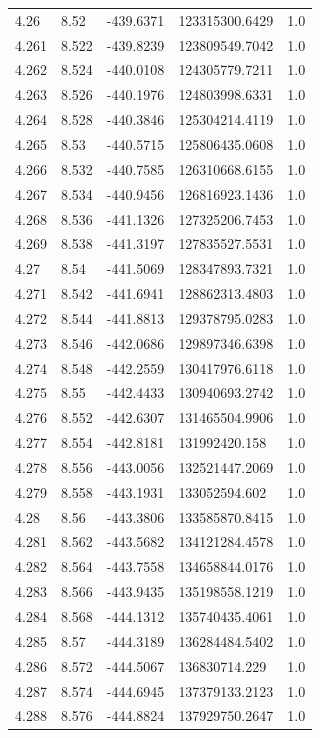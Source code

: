 \begin{tabular}{lllll}
4.26 & 8.52 & -439.6371 & 123315300.6429 & 1.0 \\
4.261 & 8.522 & -439.8239 & 123809549.7042 & 1.0 \\
4.262 & 8.524 & -440.0108 & 124305779.7211 & 1.0 \\
4.263 & 8.526 & -440.1976 & 124803998.6331 & 1.0 \\
4.264 & 8.528 & -440.3846 & 125304214.4119 & 1.0 \\
4.265 & 8.53 & -440.5715 & 125806435.0608 & 1.0 \\
4.266 & 8.532 & -440.7585 & 126310668.6155 & 1.0 \\
4.267 & 8.534 & -440.9456 & 126816923.1436 & 1.0 \\
4.268 & 8.536 & -441.1326 & 127325206.7453 & 1.0 \\
4.269 & 8.538 & -441.3197 & 127835527.5531 & 1.0 \\
4.27 & 8.54 & -441.5069 & 128347893.7321 & 1.0 \\
4.271 & 8.542 & -441.6941 & 128862313.4803 & 1.0 \\
4.272 & 8.544 & -441.8813 & 129378795.0283 & 1.0 \\
4.273 & 8.546 & -442.0686 & 129897346.6398 & 1.0 \\
4.274 & 8.548 & -442.2559 & 130417976.6118 & 1.0 \\
4.275 & 8.55 & -442.4433 & 130940693.2742 & 1.0 \\
4.276 & 8.552 & -442.6307 & 131465504.9906 & 1.0 \\
4.277 & 8.554 & -442.8181 & 131992420.158 & 1.0 \\
4.278 & 8.556 & -443.0056 & 132521447.2069 & 1.0 \\
4.279 & 8.558 & -443.1931 & 133052594.602 & 1.0 \\
4.28 & 8.56 & -443.3806 & 133585870.8415 & 1.0 \\
4.281 & 8.562 & -443.5682 & 134121284.4578 & 1.0 \\
4.282 & 8.564 & -443.7558 & 134658844.0176 & 1.0 \\
4.283 & 8.566 & -443.9435 & 135198558.1219 & 1.0 \\
4.284 & 8.568 & -444.1312 & 135740435.4061 & 1.0 \\
4.285 & 8.57 & -444.3189 & 136284484.5402 & 1.0 \\
4.286 & 8.572 & -444.5067 & 136830714.229 & 1.0 \\
4.287 & 8.574 & -444.6945 & 137379133.2123 & 1.0 \\
4.288 & 8.576 & -444.8824 & 137929750.2647 & 1.0 \\

\end{tabular}

